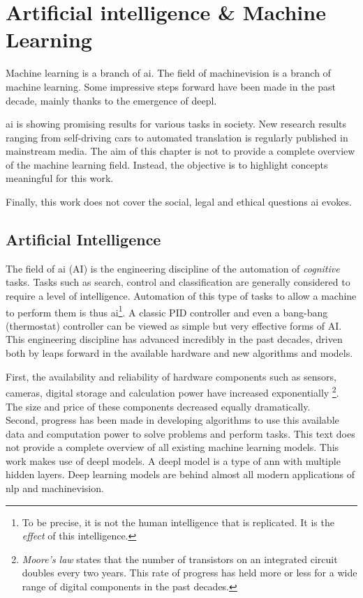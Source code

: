 \chapter{Artificial intelligence \& Machine Learning\label{sec:ai_and_ml}}
\par{
    Machine learning is a branch of \Gls{ai}. 
    The field of \Gls{machinevision} is a branch of machine learning.
    Some impressive steps forward have been made in the past decade, mainly thanks to the emergence of \Gls{deepl}.
}
\par{
    \Gls{ai} is showing promising results for various tasks in society.
    New research results ranging from self-driving cars to automated translation is regularly published in mainstream media.
    The aim of this chapter is not to provide a complete overview of the machine learning field.
    Instead, the objective is to highlight concepts meaningful for this work.
}
\par{
    Finally, this work does not cover the social, legal and ethical questions \Gls{ai} evokes.
}

\section{Artificial Intelligence}
\par{
    The field of \Gls{ai} (AI) is the engineering discipline of the automation of \textit{cognitive} tasks.
    Tasks such as search, control and classification are generally considered to require a level of intelligence. 
    Automation of this type of tasks to allow a machine to perform them is thus \Gls{ai}\footnote{To be precise, it is not the human intelligence that is replicated. It is the \textit{effect} of this intelligence.}.
    A classic PID controller and even a bang-bang (thermostat) controller can be viewed as simple but very effective forms of AI.
    This engineering discipline has advanced incredibly in the past decades, driven both by leaps forward in the available hardware and new algorithms and models. 
}
\par{
    First, the availability and reliability of hardware components such as sensors, cameras, digital storage and calculation power have increased exponentially 
    \footnote{ \textit{Moore's law} states that the number of transistors on an integrated circuit doubles every two years. This rate of progress has held more or less for a wide range of digital components in the past decades.}.
    The size and price of these components decreased equally dramatically. \\
    Second, progress has been made in developing algorithms to use this available data and computation power to solve problems and perform tasks.
    This text does not provide a complete overview of all existing machine learning models. 
    This work makes use of \Gls{deepl} models.
    A \Gls{deepl} model is a type of \acrfull{ann} with multiple hidden layers. 
    Deep learning models are behind almost all modern applications of \acrfull{nlp} and \Gls{machinevision}.
}

